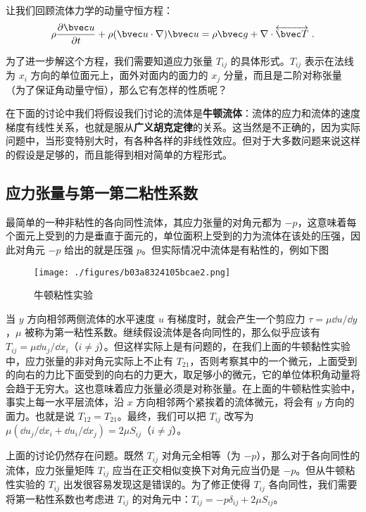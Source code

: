 
让我们回顾流体力学的动量守恒方程：
\begin{equation}
\rho \frac{\partial \bvec u}{\partial t}+\rho(\bvec u\cdot \nabla)\bvec u=\rho \bvec g+\nabla\cdot \overleftrightarrow {\bvec T}~.
\end{equation}

为了进一步解这个方程，我们需要知道应力张量 $T_{ij}$ 的具体形式。$T_{ij}$ 表示在法线为 $x_i$ 方向的单位面元上，面外对面内的面力的 $x_j$ 分量，而且是二阶对称张量（为了保证角动量守恒），那么它有怎样的性质呢？

在下面的讨论中我们将假设我们讨论的流体是\textbf{牛顿流体}：流体的应力和流体的速度梯度有线性关系，也就是服从\textbf{广义胡克定律}的关系。这当然是不正确的，因为实际问题中，当形变特别大时，有各种各样的非线性效应。但对于大多数问题来说这样的假设是足够的，而且能得到相对简单的方程形式。

\subsection{应力张量与第一第二粘性系数}
最简单的一种非粘性的各向同性流体，其应力张量的对角元都为 $-p$，这意味着每个面元上受到的力是垂直于面元的，单位面积上受到的力为流体在该处的压强，因此对角元 $-p$ 给出的就是压强 $p$。但实际情况中流体是有粘性的，例如下图
\begin{figure}[ht]
\centering
\texttt{[image: ./figures/b03a8324105bcae2.png]}
\caption{牛顿粘性实验} \label{fig_NSeq_1}
\end{figure}
当 $y$ 方向相邻两侧流体的水平速度 $u$ 有梯度时，就会产生一个剪应力 $\tau=\mu \dd u/\dd y$，$\mu$ 被称为第一粘性系数。继续假设流体是各向同性的，那么似乎应该有 $T_{ij}=\mu \dd u_j/\dd x_i$（$i\neq j$）。但这样实际上是有问题的，在我们上面的牛顿黏性实验中，应力张量的非对角元实际上不止有 $T_{21}$，否则考察其中的一个微元，上面受到的向右的力比下面受到的向右的力更大，取足够小的微元，它的单位体积角动量将会趋于无穷大。这也意味着应力张量必须是对称张量。在上面的牛顿粘性实验中，事实上每一水平层流体，沿 $x$ 方向相邻两个紧挨着的流体微元，将会有 $y$ 方向的面力。也就是说 $T_{12}=T_{21}$。最终，我们可以把 $T_{ij}$ 改写为 $\mu (\dd u_j/\dd x_i+\dd u_i/\dd x_j)=2\mu S_{ij}$（$i\neq j$）。

上面的讨论仍然存在问题。既然 $T_{ij}$ 对角元全相等（为 $-p$），那么对于各向同性的流体，应力张量矩阵 $T_{ij}$ 应当在正交相似变换下对角元应当仍是 $-p$。但从牛顿粘性实验的 $T_{ij}$ 出发很容易发现这是错误的。为了修正使得 $T_{ij}$ 各向同性，我们需要将第一粘性系数也考虑进 $T_{ij}$ 的对角元中：$T_{ij} = -p\delta_{ij}+2\mu S_{ij}$。


